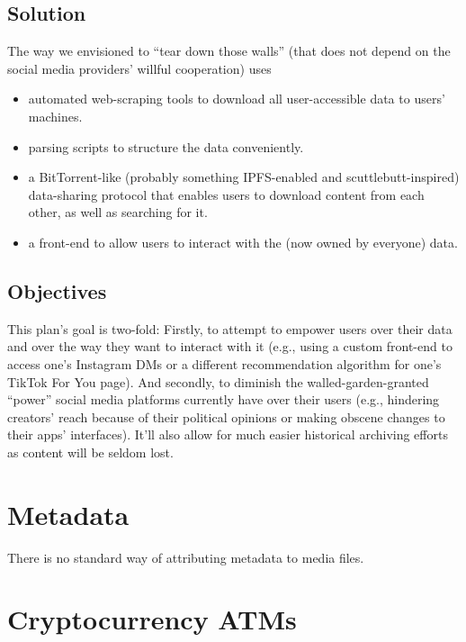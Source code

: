 \documentclass[a4paper,12pt]{report}
\begin{document}
\section{Solution}

The way we envisioned to ``tear down those walls'' (that does not depend on the social media providers' willful cooperation) uses
\begin{itemize}
  \item automated web-scraping tools to download all user-accessible data to users' machines.
  \item parsing scripts to structure the data conveniently\footnotemark.
  \item a BitTorrent-like (probably something IPFS-enabled and scuttlebutt-inspired) data-sharing protocol that enables users to download content from each other, as well as searching for it.
  \item a front-end to allow users to interact with the (now owned by everyone) data.
\end{itemize}

\section{Objectives}

This plan's goal is two-fold:
Firstly, to attempt to empower users over their data and over the way they want to interact with it (e.g., using a custom front-end to access one's Instagram DMs or a different recommendation algorithm for one's TikTok For You page).
And secondly, to diminish the walled-garden-granted ``power'' social media platforms currently have over their users (e.g., hindering creators' reach because of their political opinions or making obscene changes to their apps' interfaces).
It'll also allow for much easier historical archiving efforts as content will be seldom lost\footnotemark.


\chapter{Metadata}

There is no standard way of attributing metadata to media files.


\chapter{Cryptocurrency ATMs}
\end{document}

